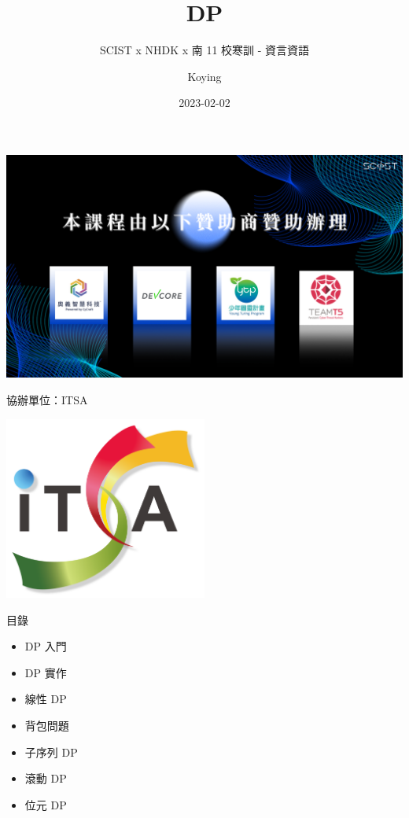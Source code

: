 \documentclass[aspectratio=169]{beamer}
\title{DP}
\author{Koying}
\subtitle{SCIST x NHDK x 南 11 校寒訓 - 資言資語}
\date{2023-02-02}
\begin{document}
    \begin{frame}
        \titlepage
    \end{frame}

    \begin{frame}
        \includegraphics[width=\textwidth]{./img/SCIST_Sponser.png}
    \end{frame}

    \begin{frame}{協辦單位：ITSA}
        \begin{center}
            \includegraphics[width=0.5\textwidth]{./img/ITSA.png}
        \end{center}
    \end{frame}


    \begin{frame}{目錄}
        \begin{itemize}
            \item DP 入門
            \item DP 實作
            \item 線性 DP
            \item 背包問題
            \item 子序列 DP
            \item 滾動 DP
            \item 位元 DP
        \end{itemize}
    \end{frame}
\end{document}
